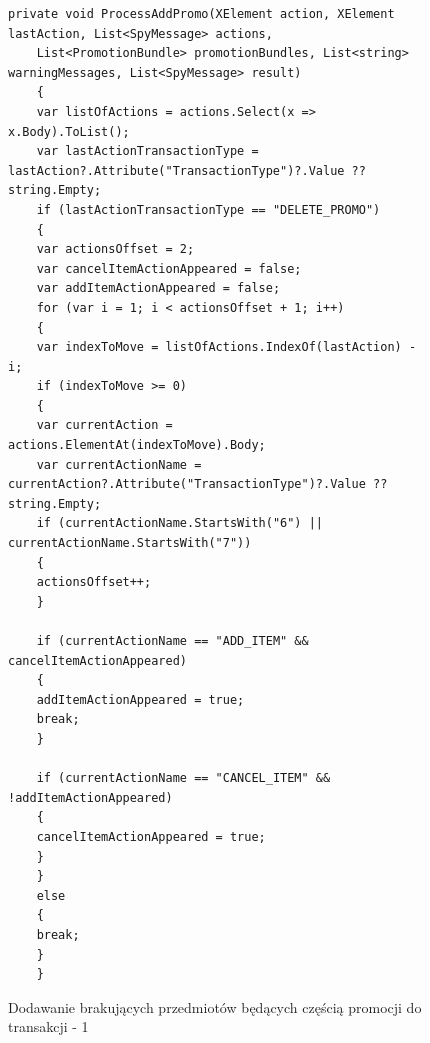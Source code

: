 \documentclass[a4paper]{book}
\begin{document}
\begin{figure}[h]
	\begin{lstlisting}[frame=single, breaklines=true]
	private void ProcessAddPromo(XElement action, XElement lastAction, List<SpyMessage> actions,
	List<PromotionBundle> promotionBundles, List<string> warningMessages, List<SpyMessage> result)
	{
	var listOfActions = actions.Select(x => x.Body).ToList();
	var lastActionTransactionType = lastAction?.Attribute("TransactionType")?.Value ?? string.Empty;
	if (lastActionTransactionType == "DELETE_PROMO")
	{
	var actionsOffset = 2;
	var cancelItemActionAppeared = false;
	var addItemActionAppeared = false;
	for (var i = 1; i < actionsOffset + 1; i++)
	{
	var indexToMove = listOfActions.IndexOf(lastAction) - i;
	if (indexToMove >= 0)
	{
	var currentAction = actions.ElementAt(indexToMove).Body;
	var currentActionName = currentAction?.Attribute("TransactionType")?.Value ?? string.Empty;
	if (currentActionName.StartsWith("6") || currentActionName.StartsWith("7"))
	{
	actionsOffset++;
	}
	
	if (currentActionName == "ADD_ITEM" && cancelItemActionAppeared)
	{
	addItemActionAppeared = true;
	break;
	}
	
	if (currentActionName == "CANCEL_ITEM" && !addItemActionAppeared)
	{
	cancelItemActionAppeared = true;
	}
	}
	else
	{
	break;
	}
	}
	\end{lstlisting}
	\caption{Dodawanie brakujących przedmiotów będących częścią promocji do transakcji - 1}
	\label{lst:brakujaceProdukty1}
\end{figure}
\end{document}
